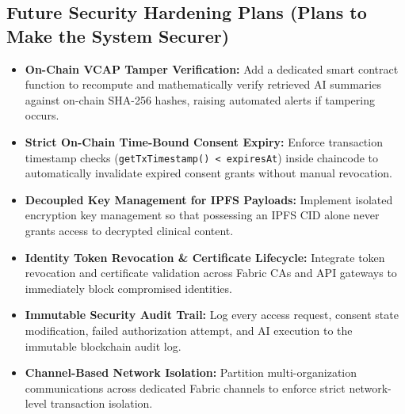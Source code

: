 \documentclass[11pt,a4paper]{article}
\begin{document}
\subsection{Future Security Hardening Plans (Plans to Make the System Securer)}
\begin{itemize}
    \item \textbf{On-Chain VCAP Tamper Verification:} Add a dedicated smart contract function to recompute and mathematically verify retrieved AI summaries against on-chain SHA-256 hashes, raising automated alerts if tampering occurs.
    \item \textbf{Strict On-Chain Time-Bound Consent Expiry:} Enforce transaction timestamp checks (\texttt{getTxTimestamp() < expiresAt}) inside chaincode to automatically invalidate expired consent grants without manual revocation.
    \item \textbf{Decoupled Key Management for IPFS Payloads:} Implement isolated encryption key management so that possessing an IPFS CID alone never grants access to decrypted clinical content.
    \item \textbf{Identity Token Revocation \& Certificate Lifecycle:} Integrate token revocation and certificate validation across Fabric CAs and API gateways to immediately block compromised identities.
    \item \textbf{Immutable Security Audit Trail:} Log every access request, consent state modification, failed authorization attempt, and AI execution to the immutable blockchain audit log.
    \item \textbf{Channel-Based Network Isolation:} Partition multi-organization communications across dedicated Fabric channels to enforce strict network-level transaction isolation.
\end{itemize}
\end{document}
